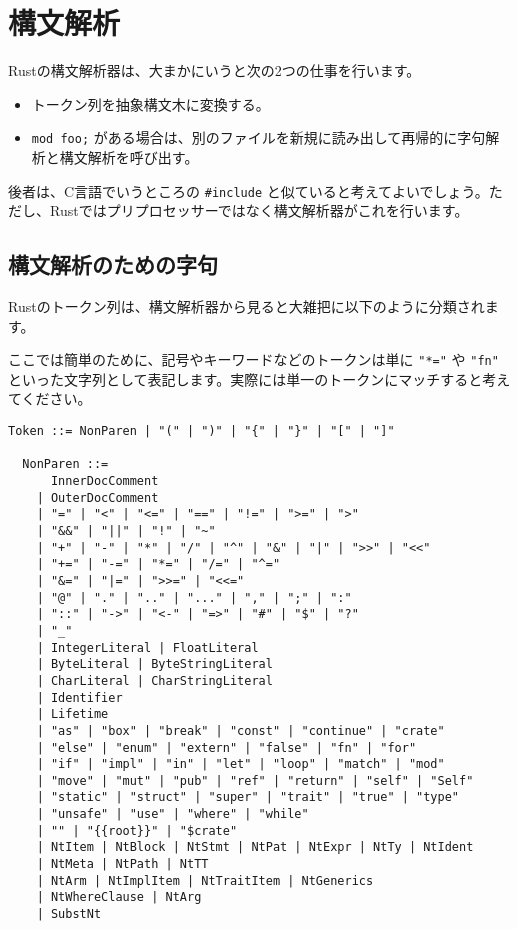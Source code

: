 \documentclass[dvipdfmx,uplatex,papersize,a4paper,10pt]{jsbook}
\theoremstyle{definition}
\begin{document}
\section{構文解析}

Rustの構文解析器は、大まかにいうと次の2つの仕事を行います。

\begin{itemize}
  \item トークン列を抽象構文木に変換する。
  \item \verb|mod foo;| がある場合は、別のファイルを新規に読み出して再帰的に字句解析と構文解析を呼び出す。
\end{itemize}

後者は、C言語でいうところの \verb|#include| と似ていると考えてよいでしょう。ただし、Rustではプリプロセッサーではなく構文解析器がこれを行います。

\subsection{構文解析のための字句}

Rustのトークン列は、構文解析器から見ると大雑把に以下のように分類されます。

ここでは簡単のために、記号やキーワードなどのトークンは単に \verb|"*="| や \verb|"fn"| といった文字列として表記します。実際には単一のトークンにマッチすると考えてください。

\begin{lstlisting}[language=BNFLike, gobble=2]
  Token ::= NonParen | "(" | ")" | "{" | "}" | "[" | "]"

  NonParen ::=
      InnerDocComment
    | OuterDocComment
    | "=" | "<" | "<=" | "==" | "!=" | ">=" | ">"
    | "&&" | "||" | "!" | "~"
    | "+" | "-" | "*" | "/" | "^" | "&" | "|" | ">>" | "<<"
    | "+=" | "-=" | "*=" | "/=" | "^="
    | "&=" | "|=" | ">>=" | "<<="
    | "@" | "." | ".." | "..." | "," | ";" | ":"
    | "::" | "->" | "<-" | "=>" | "#" | "$" | "?"
    | "_"
    | IntegerLiteral | FloatLiteral
    | ByteLiteral | ByteStringLiteral
    | CharLiteral | CharStringLiteral
    | Identifier
    | Lifetime
    | "as" | "box" | "break" | "const" | "continue" | "crate"
    | "else" | "enum" | "extern" | "false" | "fn" | "for"
    | "if" | "impl" | "in" | "let" | "loop" | "match" | "mod"
    | "move" | "mut" | "pub" | "ref" | "return" | "self" | "Self"
    | "static" | "struct" | "super" | "trait" | "true" | "type"
    | "unsafe" | "use" | "where" | "while"
    | "" | "{{root}}" | "$crate"
    | NtItem | NtBlock | NtStmt | NtPat | NtExpr | NtTy | NtIdent
    | NtMeta | NtPath | NtTT
    | NtArm | NtImplItem | NtTraitItem | NtGenerics
    | NtWhereClause | NtArg
    | SubstNt
\end{lstlisting}
\end{document}
